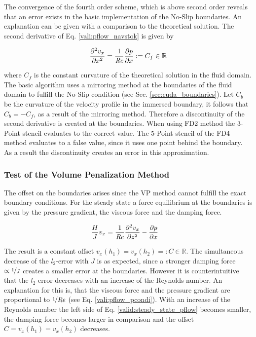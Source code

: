 The convergence of the fourth order scheme, which is above second order
reveals that an error exists in the basic implementation of the No-Slip boundaries.
An explanation can be given with a comparison to the theoretical solution.
The second derivative of Eq. \ref{vali:pflow_navstok}  is given by

\begin{align}
    \pdn[^2 v_x]{x^2} = \frac{1}{\Rey}\pdn[p]{x} := C_f\in\mathbb{R}
\end{align}

where $C_f$ is the constant curvature of the theoretical solution in the fluid domain.
The basic algorithm uses a mirroring method at the boundaries of the fluid domain to fulfill the No-Slip condition (see Sec. \ref{sec:cuda_boundaries}).
Let $C_b$ be the curvature of the velocity profile in the immersed boundary, it follows that $C_b = - C_f$, as a result of the mirroring method.
Therefore a discontinuity of the second derivative is created at the boundaries.
When using FD2 method the 3-Point stencil evaluates to the correct value.
The 5-Point stencil of the FD4 method evaluates to a false value, since it uses one point behind the boundary.
As a result the discontinuity creates an error in this approximation.

\clearpage

\subsubsection{Test of the Volume Penalization Method}

The offset on the boundaries arises since the VP method cannot fulfill the exact boundary conditions.
For the steady state a force equilibrium at the boundaries is given by the pressure gradient, the viscous force and the damping force.

\begin{align}
\label{valid:steady_state_pflow}
 \frac{H}{J} v_x &=  \frac{1}{\Rey}\frac{\partial^2 v_x}{\partial z^2} -\pdn[p]{x}
\end{align}

The result is a constant offset $v_x(h_1) = v_x(h_2) =: C\in\mathbb{R}$.
The simultaneous decrease of the $l_2$-error with $J$ is as expected, since a stronger damping force $\propto \nicefrac{1}{J}$ creates a smaller
error at the boundaries.
However it is counterintuitive that the $l_2$-error decreases with an increase of the Reynolds number.
An explanation for this is, that the viscous force and the pressure gradient are proportional to $\nicefrac{1}{\Rey}$
(see Eq. \ref{vali:pflow_pcondi}).
With an increase of the Reynolds number the left side of Eq. \ref{valid:steady_state_pflow} becomes smaller,
the damping force becomes larger in comparison and the  offset $C=v_x(h_1)=v_x(h_2)$ decreases.

